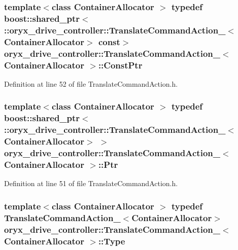 \subsubsection[{\-Const\-Ptr}]{\setlength{\rightskip}{0pt plus 5cm}template$<$class Container\-Allocator $>$ typedef boost\-::shared\-\_\-ptr$<$ \-::{\bf oryx\-\_\-drive\-\_\-controller\-::\-Translate\-Command\-Action\-\_\-}$<$\-Container\-Allocator$>$ const$>$ {\bf oryx\-\_\-drive\-\_\-controller\-::\-Translate\-Command\-Action\-\_\-}$<$ \-Container\-Allocator $>$\-::{\bf \-Const\-Ptr}}\label{structoryx__drive__controller_1_1TranslateCommandAction___a444b584a115a49fc99c8ca8fcf53fd45}


\-Definition at line 52 of file \-Translate\-Command\-Action.\-h.

\subsubsection[{\-Ptr}]{\setlength{\rightskip}{0pt plus 5cm}template$<$class Container\-Allocator $>$ typedef boost\-::shared\-\_\-ptr$<$ \-::{\bf oryx\-\_\-drive\-\_\-controller\-::\-Translate\-Command\-Action\-\_\-}$<$\-Container\-Allocator$>$ $>$ {\bf oryx\-\_\-drive\-\_\-controller\-::\-Translate\-Command\-Action\-\_\-}$<$ \-Container\-Allocator $>$\-::{\bf \-Ptr}}\label{structoryx__drive__controller_1_1TranslateCommandAction___a38dc5fa16f1c032f5759dff40bbafe1c}


\-Definition at line 51 of file \-Translate\-Command\-Action.\-h.

\subsubsection[{\-Type}]{\setlength{\rightskip}{0pt plus 5cm}template$<$class Container\-Allocator $>$ typedef {\bf \-Translate\-Command\-Action\-\_\-}$<$\-Container\-Allocator$>$ {\bf oryx\-\_\-drive\-\_\-controller\-::\-Translate\-Command\-Action\-\_\-}$<$ \-Container\-Allocator $>$\-::{\bf \-Type}}\label{structoryx__drive__controller_1_1TranslateCommandAction___a58cb36f49a1f965f4e85989a5731fc03}


